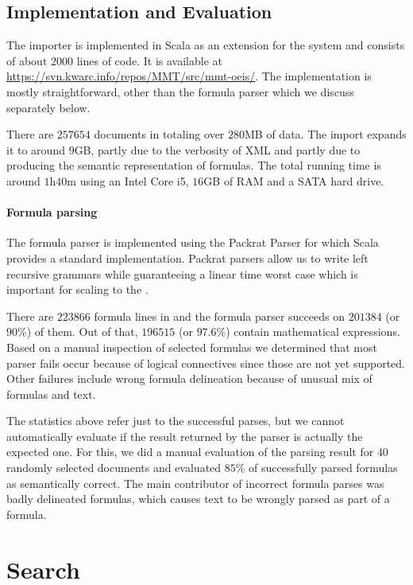 \subsection{Implementation and Evaluation}
The importer is implemented in Scala as an extension for the \mmt system and consists of about 2000 lines of code.
It is available at \url{https://svn.kwarc.info/repos/MMT/src/mmt-oeis/}. The implementation is mostly straightforward,
other than the formula parser which we discuss separately below.

There are $257654$ documents in \oeis totaling over $280$MB of data. The \omdmmt import expands it to around
$9$GB,
partly due to the verbosity of XML and partly due to producing the semantic representation of formulas.
The total running time is around $1$h$40$m  using an Intel Core i5, $16$GB of RAM and a SATA hard drive.

\paragraph{Formula parsing} The formula parser is implemented using the Packrat Parser \cite{packrat} for which Scala
provides a standard implementation. Packrat parsers allow us to write left recursive grammars while guaranteeing a
linear time worst case which is important for scaling to the \oeis.

 There are $223866$ formula lines in \oeis and the formula parser succeeds on $201384$ (or
$90\%$) of them. Out of that, $196515$ (or $97.6\%$) contain mathematical expressions.
Based on a manual inspection of selected formulas we determined that most parser fails occur because of
logical connectives since those are not yet supported. Other failures include
wrong formula delineation because of unusual mix of formulas and text.

The statistics above refer just to the successful parses, but we cannot automatically evaluate if the result
returned by the parser is actually the expected one. For this, we did a manual evaluation of the parsing result for
$40$ randomly selected \oeis documents and evaluated $85$\% of successfully
parsed formulas as semantically correct. The main contributor of incorrect formula parses was badly delineated
formulas, which causes text to be wrongly parsed as part of a formula.

\section{Search} \label{sec:Search}

